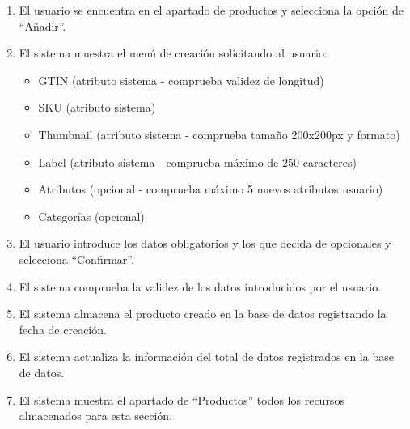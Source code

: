 \begin{enumerate}
    \item El usuario se encuentra en el apartado de productos y selecciona la opción de “Añadir”.
    \item El sistema muestra el menú de creación solicitando al usuario:
    \begin{itemize}
        \item GTIN (atributo sistema - comprueba validez de longitud)
        \item SKU (atributo sistema)
        \item Thumbnail (atributo sistema - comprueba tamaño 200x200px y formato)
        \item Label (atributo sistema - comprueba máximo de 250 caracteres)
        \item Atributos (opcional - comprueba máximo 5 nuevos atributos usuario)
        \item Categorías (opcional)
    \end{itemize}
    \item El usuario introduce los datos obligatorios y los que decida de opcionales y selecciona “Confirmar”.
    \item El sistema comprueba la validez de los datos introducidos por el usuario.
    \item El sistema almacena el producto creado en la base de datos registrando la fecha de creación.
    \item El sistema actualiza la información del total de datos registrados en la base de datos.
    \item El sistema muestra el apartado de “Productos” todos los recursos almacenados para esta sección.
\end{enumerate}


